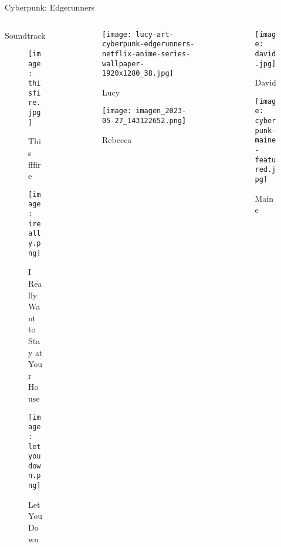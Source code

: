 \documentclass[aspectratio = 1609]{beamer}
\begin{document}
\begin{frame}{Cyberpunk: Edgerunners}
\begin{columns}
\begin{column}{.1\textwidth}
    
    \colorbox{white}{Soundtrack}
    \begin{figure}
        \captionsetup{font=tiny}
        \centering
        \texttt{[image: thisfire.jpg]}
        \caption{This fffire}
        \label{fig:my_label}
    \end{figure}
    \vspace{-0.5cm}
    \begin{figure}
        \captionsetup{font=tiny}
        \centering
        \texttt{[image: ireally.png]}
        \caption{I Really Want to Stay at Your House}
    \end{figure}
    \vspace{-0.5cm}
    \begin{figure}
        \captionsetup{font=tiny}
        \centering
        \texttt{[image: letyoudown.png]}
        \caption{Let You Down}
        \label{fig:my_label}
    \end{figure}
    \end{column}

    \begin{column}{.45\textwidth}
    \begin{figure}
        \texttt{[image: lucy-art-cyberpunk-edgerunners-netflix-anime-series-wallpaper-1920x1280\_38.jpg]}
        \caption{Lucy}
    \end{figure}
    \vspace{-0.5cm}
    \begin{figure}
        \texttt{[image: imagen\_2023-05-27\_143122652.png]}
        \caption{Rebecca}
    \end{figure}
    \end{column}
    
    \hspace{-0.7cm}
    
    \begin{column}{.45\textwidth}
    \begin{figure}
        \texttt{[image: david.jpg]}
        \caption{David}
    \end{figure}
    \vspace{-0.5cm}
    \begin{figure}
        \texttt{[image: cyberpunk-maine-featured.jpg]}
        \caption{\colorbox{white}{Maine}}
    \end{figure}
    \end{column}
\end{columns}
\end{frame}
\end{document}

